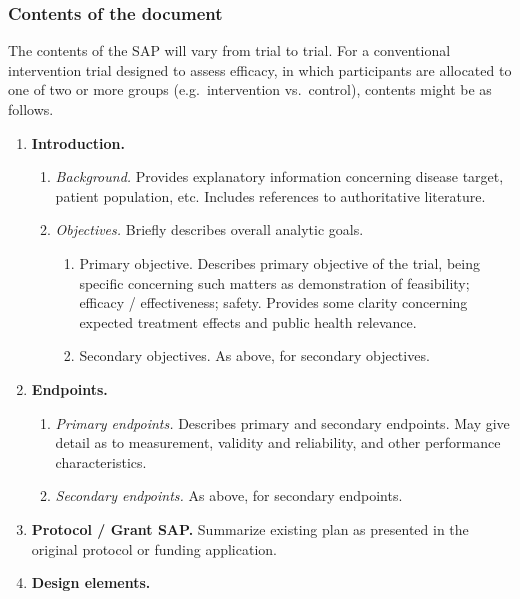 \documentclass[]{book}
\providecommand{\tightlist}{%
  \setlength{\itemsep}{0pt}\setlength{\parskip}{0pt}}
\theoremstyle{definition}
\theoremstyle{definition}
\theoremstyle{definition}
\theoremstyle{remark}
\begin{document}
\subsubsection{Contents of the document}\label{contents-of-the-document}

The contents of the SAP will vary from trial to trial. For a
conventional intervention trial designed to assess efficacy, in which
participants are allocated to one of two or more groups
(e.g.~intervention vs.~control), contents might be as follows.

\begin{enumerate}
\def\labelenumi{\arabic{enumi}.}
\tightlist
\item
  \textbf{Introduction.}

  \begin{enumerate}
  \def\labelenumii{\alph{enumii}.}
  \tightlist
  \item
    \emph{Background.} Provides explanatory information concerning
    disease target, patient population, etc. Includes references to
    authoritative literature.
  \item
    \emph{Objectives.} Briefly describes overall analytic goals.

    \begin{enumerate}
    \def\labelenumiii{\roman{enumiii}.}
    \tightlist
    \item
      Primary objective. Describes primary objective of the trial, being
      specific concerning such matters as demonstration of feasibility;
      efficacy / effectiveness; safety. Provides some clarity concerning
      expected treatment effects and public health relevance.
    \item
      Secondary objectives. As above, for secondary objectives.
    \end{enumerate}
  \end{enumerate}
\item
  \textbf{Endpoints.}

  \begin{enumerate}
  \def\labelenumii{\alph{enumii}.}
  \tightlist
  \item
    \emph{Primary endpoints.} Describes primary and secondary endpoints.
    May give detail as to measurement, validity and reliability, and
    other performance characteristics.
  \item
    \emph{Secondary endpoints.} As above, for secondary endpoints.
  \end{enumerate}
\item
  \textbf{Protocol / Grant SAP.} Summarize existing plan as presented in
  the original protocol or funding application.\\
\item
  \textbf{Design elements.}


\end{enumerate}
\end{document}
